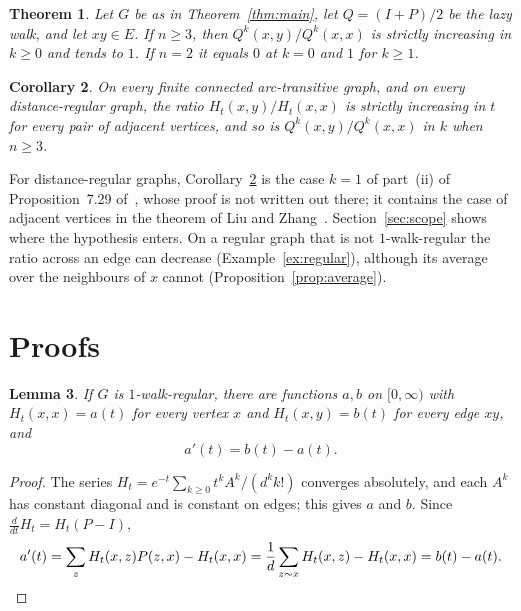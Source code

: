 \documentclass[11pt]{amsart}
\newtheorem{theorem}{Theorem}[section]
\newtheorem{lemma}[theorem]{Lemma}
\newtheorem{corollary}[theorem]{Corollary}
\theoremstyle{definition}
\theoremstyle{remark}
\begin{document}
\begin{theorem}\label{thm:lazy}
Let $G$ be as in Theorem~\ref{thm:main}, let $Q=(I+P)/2$ be the lazy walk, and let $xy\in E$. If $n\ge3$, then $Q^k(x,y)/Q^k(x,x)$ is strictly increasing in $k\ge0$ and tends to $1$. If $n=2$ it equals $0$ at $k=0$ and $1$ for $k\ge1$.
\end{theorem}

\begin{corollary}\label{cor:arc}
On every finite connected arc-transitive graph, and on every distance-regular graph, the ratio $H_t(x,y)/H_t(x,x)$ is strictly increasing in $t$ for every pair of adjacent vertices, and so is $Q^k(x,y)/Q^k(x,x)$ in $k$ when $n\ge3$.
\end{corollary}

For distance-regular graphs, Corollary~\ref{cor:arc} is the case $k=1$ of part~(ii) of Proposition~7.29 of~\cite{AF}, whose proof is not written out there; it contains the case of adjacent vertices in the theorem of Liu and Zhang~\cite[Theorem~1]{LZ}. Section~\ref{sec:scope} shows where the hypothesis enters. On a regular graph that is not $1$-walk-regular the ratio across an edge can decrease (Example~\ref{ex:regular}), although its average over the neighbours of $x$ cannot (Proposition~\ref{prop:average}).

\section{Proofs}

\begin{lemma}\label{lem:constant}
If $G$ is $1$-walk-regular, there are functions $a,b$ on $[0,\infty)$ with $H_t(x,x)=a(t)$ for every vertex $x$ and $H_t(x,y)=b(t)$ for every edge $xy$, and
\[
a'(t)=b(t)-a(t).
\]
\end{lemma}

\begin{proof}
The series $H_t=e^{-t}\sum_{k\ge0}t^kA^k/(d^kk!)$ converges absolutely, and each $A^k$ has constant diagonal and is constant on edges; this gives $a$ and $b$. Since $\frac{d}{dt}H_t=H_t(P-I)$,
\[
a'(t)=\sum_{z}H_t(x,z)P(z,x)-H_t(x,x)=\frac1d\sum_{z\sim x}H_t(x,z)-H_t(x,x)=b(t)-a(t). \qedhere
\]
\end{proof}
\end{document}

